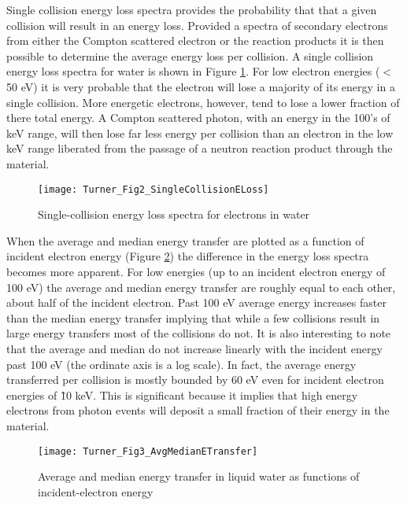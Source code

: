 Single collision energy loss spectra provides the probability that that a given collision will result in an energy loss.
Provided a spectra of secondary electrons from either the Compton scattered electron or the  reaction products it is then possible to determine the average energy loss per collision.
A single collision energy loss spectra for water is shown in Figure \ref{fig:TurnerELoss}.
For low electron energies ($<$ 50 eV) it is very probable that the electron will lose a majority of its energy in a single collision.
More energetic electrons, however, tend to lose a lower fraction of there total energy. 
A Compton scattered photon, with an energy in the 100's of keV range, will then lose far less energy per collision than an electron in the low keV range liberated from the passage of a neutron reaction product through the material.
\begin{figure}[ht]
    \centering
    \texttt{[image: Turner\_Fig2\_SingleCollisionELoss]}
    \caption{Single-collision energy loss spectra for electrons in water \protect\cite{turner_comparative_1982}}
    \label{fig:TurnerELoss}
\end{figure}
When the average and median energy transfer are plotted as a function of incident electron energy (Figure \ref{fig:TurnerETransfer}) the difference in the energy loss spectra becomes more apparent.
For low energies (up to an incident electron energy of 100 eV) the average and median energy transfer are roughly equal to each other, about half of the incident electron.
Past 100 eV average energy increases faster than the median energy transfer implying that while a few collisions result in large energy transfers most of the collisions do not.
It is also interesting to note that the average and median do not increase linearly with the incident energy past 100 eV (the ordinate axis is a log scale). 
In fact, the average energy transferred per collision is mostly bounded by 60 eV even for incident electron energies of \~10 keV.
This is significant because it implies that high energy electrons from photon events will deposit a small fraction of their energy in the material.
\begin{figure}[ht]
    \centering
    \texttt{[image: Turner\_Fig3\_AvgMedianETransfer]}
    \caption{Average and median energy transfer in liquid water as functions of incident-electron energy \protect\cite{turner_comparative_1982}}
    \label{fig:TurnerETransfer}
\end{figure}
